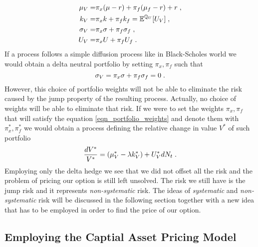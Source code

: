 \documentclass[times, utf8, diplomski]{fer}
\begin{document}
\begin{equation} \label{eqn_portfolio_params}
\begin{split}
	\mu_V =& \pi_x(\mu - r) + \pi_f(\mu_f - r) + r  \hspace{0.1cm},\\
	k_V =& \pi_x k + \pi_f k_f = \mathbb{E}^{\mathbb{Q}_U}[U_V]  \hspace{0.1cm},\\
	\sigma_V =& \pi_x\sigma + \pi_f\sigma_f  \hspace{0.1cm},\\
	U_V =& \pi_x U + \pi_f U_f \hspace{0.1cm}.
\end{split}
\end{equation}
If a process follows a simple diffusion process like in Black-Scholes world we would obtain a delta neutral portfolio by setting $\pi_x, \pi_f$ such that
\begin{equation} \label{eqn_portfolio_weights}
	\sigma_V = \pi_x\sigma + \pi_f\sigma_f = 0 \hspace{0.1cm}.
\end{equation}
However, this choice of portfolio weights will not be able to eliminate the risk caused by the jump property of the resulting process. Actually, no choice of weights will be able to eliminate that risk. If we were to set the weights $\pi_x, \pi_f$ that will satisfy the equation \ref{eqn_portfolio_weights} and denote them with $\pi_x^*, \pi_f^*$ we would obtain a process defining the relative change in value $V^*$ of such portfolio
\begin{equation}
	\frac{dV^*}{V^*} = (\mu_V^* - \lambda k_V^*) + U_V^* dN_t \hspace{0.1cm}.
\end{equation}
Employing only the delta hedge we see that we did not offset all the risk and the problem of pricing our option is still left unsolved. The risk we still have is the jump risk and it represents \textit{non-systematic} risk. The ideas of \textit{systematic} and \textit{non-systematic} risk will be discussed in the following section together with a new idea that has to be employed in order to find the price of our option.

\subsection{Employing the Captial Asset Pricing Model}
\end{document}
